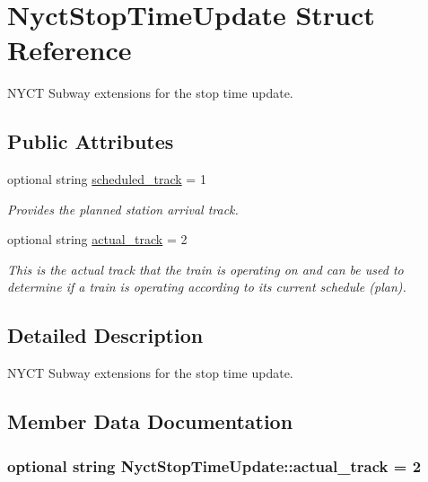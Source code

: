 \hypertarget{structNyctStopTimeUpdate}{}\section{Nyct\+Stop\+Time\+Update Struct Reference}
\label{structNyctStopTimeUpdate}


N\+Y\+CT Subway extensions for the stop time update.  


\subsection*{Public Attributes}
\begin{DoxyCompactItemize}
\item 
optional string \hyperlink{structNyctStopTimeUpdate_a07cd8f81941772b2b04bc848ac8c971b}{scheduled\+\_\+track} = 1
\begin{DoxyCompactList}\small\item\em Provides the planned station arrival track. \end{DoxyCompactList}\item 
optional string \hyperlink{structNyctStopTimeUpdate_a8a8b2d180245ec20f2565edb39b094e0}{actual\+\_\+track} = 2
\begin{DoxyCompactList}\small\item\em This is the actual track that the train is operating on and can be used to determine if a train is operating according to its current schedule (plan). \end{DoxyCompactList}\end{DoxyCompactItemize}


\subsection{Detailed Description}
N\+Y\+CT Subway extensions for the stop time update. 

\subsection{Member Data Documentation}
\subsubsection[{\texorpdfstring{actual\+\_\+track}{actual_track}}]{\setlength{\rightskip}{0pt plus 5cm}optional string Nyct\+Stop\+Time\+Update\+::actual\+\_\+track = 2}\hypertarget{structNyctStopTimeUpdate_a8a8b2d180245ec20f2565edb39b094e0}{}\label{structNyctStopTimeUpdate_a8a8b2d180245ec20f2565edb39b094e0}


